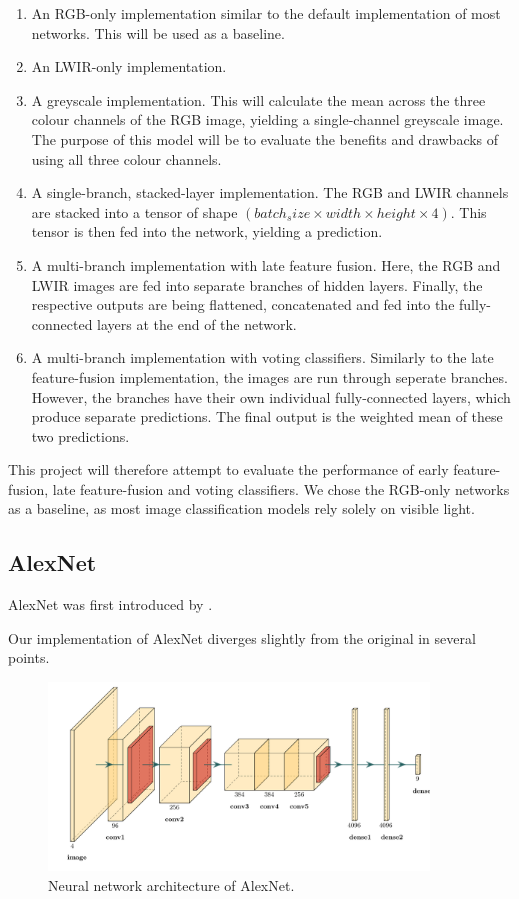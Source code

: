 \documentclass{l4proj}
\begin{document}
\begin{enumerate}
  \item An RGB-only implementation similar to the default implementation of most networks. This will be used as a baseline.
  \item An LWIR-only implementation.
  \item A greyscale implementation. This will calculate the mean across the three colour channels of the RGB image, yielding a single-channel greyscale image. The purpose of this model will be to evaluate the benefits and drawbacks of using all three colour channels.
  \item A single-branch, stacked-layer implementation. The RGB and LWIR channels are stacked into a tensor of shape $({batch_size} \times width \times height \times 4)$. This tensor is then fed into the network, yielding a prediction.
  \item A multi-branch implementation with late feature fusion. Here, the RGB and LWIR images are fed into separate branches of hidden layers. Finally, the respective outputs are being flattened, concatenated and fed into the fully-connected layers at the end of the network.
  \item A multi-branch implementation with voting classifiers. Similarly to the late feature-fusion implementation, the images are run through seperate branches. However, the branches have their own individual fully-connected layers, which produce separate predictions. The final output is the weighted mean of these two predictions. 
\end{enumerate}

This project will therefore attempt to evaluate the performance of early feature-fusion, late feature-fusion and voting classifiers. We chose the RGB-only networks as a baseline, as most image classification models rely solely on visible light.

\subsection{AlexNet}

AlexNet was first introduced by \citet{krizhevsky_imagenet_2012}.

Our implementation of AlexNet diverges slightly from the original in several points.

\begin{figure}[ht]
  \centering
  \includegraphics[width=0.9\textwidth]{images/models/alexnet}
  \caption{Neural network architecture of AlexNet.}
  \label{fig:alexnet}
\end{figure}
\end{document}
